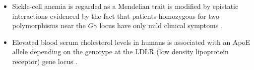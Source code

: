 \begin{itemize}
	\item Sickle-cell anemia is regarded as a Mendelian trait is modified by epistatic interactions evidenced by the fact that patients homozygous for two polymorphisms near the $G\gamma$ locus have only mild clinical symptoms \cite{culverhouse2002perspective:REF}.

	\item Elevated blood serum cholesterol levels in humans is associated with an ApoE allele depending on the genotype at the LDLR (low density lipoprotein receptor) gene locus \cite{tyler2009shadows:REF}.

\end{itemize}


